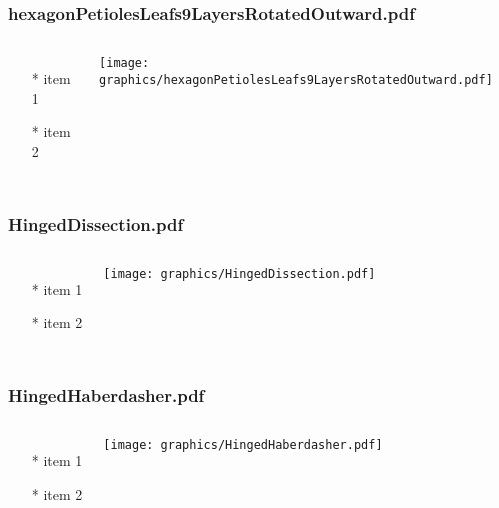 \documentclass{beamer}
\begin{document}
\begin{frame} \frametitle{hexagonPetiolesLeafs9LayersRotatedOutward.pdf}
    \begin{columns}[c]
        \begin{itemize}
            \item[*] item 1
            \item[*] item 2
        \end{itemize}
        \begin{minipage}{\linewidth}
            \begin{center}
            \texttt{[image: graphics/hexagonPetiolesLeafs9LayersRotatedOutward.pdf]}
            \label{gfx:hexagonPetiolesLeafs9LayersRotatedOutward.pdf}
            \end{center}
        \end{minipage}
    \end{columns}
\end{frame}
\begin{frame} \frametitle{HingedDissection.pdf}
    \begin{columns}[c]
        \begin{itemize}
            \item[*] item 1
            \item[*] item 2
        \end{itemize}
        \begin{minipage}{\linewidth}
            \begin{center}
            \texttt{[image: graphics/HingedDissection.pdf]}
            \label{gfx:HingedDissection.pdf}
            \end{center}
        \end{minipage}
    \end{columns}
\end{frame}
\begin{frame} \frametitle{HingedHaberdasher.pdf}
    \begin{columns}[c]
        \begin{itemize}
            \item[*] item 1
            \item[*] item 2
        \end{itemize}
        \begin{minipage}{\linewidth}
            \begin{center}
            \texttt{[image: graphics/HingedHaberdasher.pdf]}
            \label{gfx:HingedHaberdasher.pdf}
            \end{center}
        \end{minipage}
    \end{columns}
\end{frame}
\end{document}
